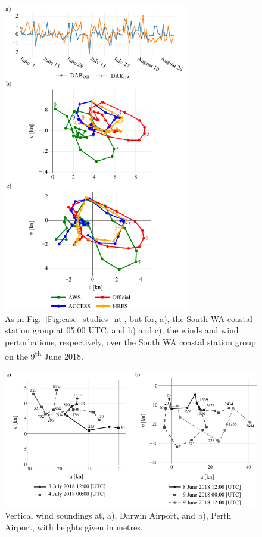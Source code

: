 \documentclass{ametsoc}
\begin{document}
\begin{figure}
\centering
\includegraphics[width=19pc]{case_studies_wa.pdf}
\caption{As in Fig.~\ref{Fig:case_studies_nt}, but for, a), the South WA coastal station group at 05:00 UTC, and b) and c), the winds and wind perturbations, respectively, over the South WA coastal station group on the 9\textsuperscript{th} June 2018.} 
\label{Fig:case_studies_wa}
\end{figure}

\begin{figure}
\centering
\includegraphics[width=33pc]{perth_sounding.pdf}
\caption{Vertical wind soundings at, a), Darwin Airport, and b), Perth Airport, with heights given in metres.}
\label{Fig:perth_sounding}
\end{figure}
\end{document}
